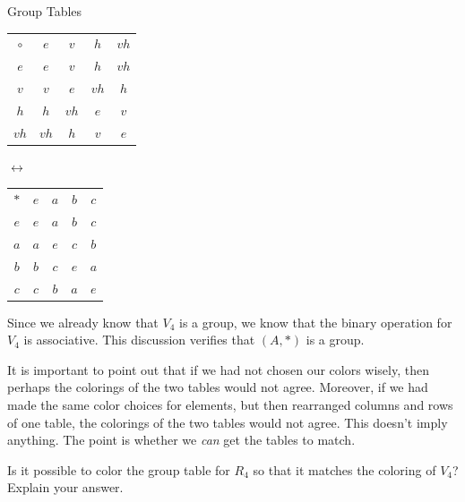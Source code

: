 \begin{section}{Group Tables}
\begin{center}
\begin{tabular}{c!{\vrule width 2pt}c|c|c|c}
$\circ$ & $e$ & $v$ & $h$ & $vh$ \\ 
$e$ & $e$ & $v$ & $h$ & $vh$ \\
\hline {}$v$ & $v$ & $e$ & $vh$ & $h$  \\
\hline {}$h$ & $h$ & $vh$ & $e$ & $v$\\
\hline {}$vh$ & $vh$ & $h$ & $v$ & $e$
\end{tabular}
\hspace{1cm}
$\longleftrightarrow$
\hspace{1cm}
\begin{tabular}{c!{\vrule width 2pt}c|c|c|c}
$*$ & $e$ & $a$ & $b$ & $c$ \\ 
$e$ & $e$ & $a$ & $b$ & $c$ \\
\hline {}$a$ & $a$ & $e$ & $c$ & $b$  \\
\hline {}$b$ & $b$ & $c$ & $e$ & $a$\\
\hline {}$c$ & $c$ & $b$ & $a$ & $e$
\end{tabular}
\end{center}

\noindent Since we already know that $V_4$ is a group, we know that the binary operation for $V_4$ is associative.  This discussion verifies that $(A,*)$ is a group.

It is important to point out that if we had not chosen our colors wisely, then perhaps the colorings of the two tables would not agree.  Moreover, if we had made the same color choices for elements, but then rearranged columns and rows of one table, the colorings of the two tables would not agree.  This doesn't imply anything.  The point is whether we \emph{can} get the tables to match.

\begin{problem}\label{prob:V4notR4coloring}
Is it possible to color the group table for $R_4$ so that it matches the coloring of $V_4$?  Explain your answer.
\end{problem}

\end{section}

